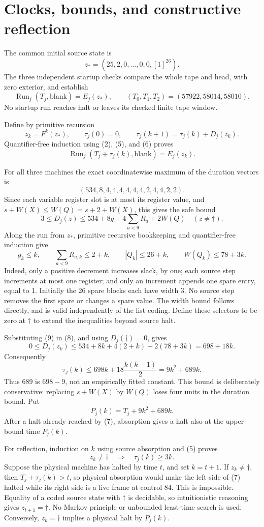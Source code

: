 \documentclass[11pt]{article}
\newcommand{\Run}{\operatorname{Run}}
\begin{document}
\section{Clocks, bounds, and constructive reflection}

The common initial source state is
\[
 z_*=(25,2,0,\ldots,0,0,[1]^{26}).
\]
The three independent startup checks compare the whole tape and head,
with zero exterior, and establish
\[
 \Run_j(T_j,\mathrm{blank})=E_j(z_*),\qquad
 (T_0,T_1,T_2)=(57922,58014,58010).                         \tag{6}
\]
No startup run reaches halt or leaves its checked finite tape window.

Define by primitive recursion
\[
 z_k=F^k(z_*),\qquad
 \tau_j(0)=0,\qquad
 \tau_j(k+1)=\tau_j(k)+D_j(z_k).
\]
Quantifier-free induction using (2), (5), and (6) proves
\[
 \Run_j(T_j+\tau_j(k),\mathrm{blank})=E_j(z_k).             \tag{7}
\]

For all three machines the exact coordinatewise maximum of the duration
vectors is
\[
 (534,8,4,4,4,4,4,4,2,4,4,2,2).
\]
Since each variable register slot is at most its register value, and
$s+W(X)\le W(Q)=s+2+W(X)$, this gives the safe bound
\[
 3\le D_j(z)\le534+8g+4\sum_{a<9}R_a+2W(Q)
 \quad(z\ne\dagger).                                    \tag{8}
\]
Along the run from $z_*$, primitive recursive bookkeeping and
quantifier-free induction give
\[
 g_k\le k,\qquad \sum_{a<9}R_{a,k}\le2+k,
 \qquad |Q_k|\le26+k,\qquad W(Q_k)\le78+3k.              \tag{9}
\]
Indeed, only a positive decrement increases slack, by one; each source
step increments at most one register; and only an increment appends one
spare entry, equal to 1. Initially the 26 spare blocks each have width
3. No source step removes the first spare or changes a spare value.
The width bound follows directly, and is valid independently of the
list coding. Define these selectors to be zero at $\dagger$ to extend
the inequalities beyond source halt.

Substituting (9) in (8), and using $D_j(\dagger)=0$, gives
\[
 0\le D_j(z_k)\le
 534+8k+4(2+k)+2(78+3k)=698+18k.
\]
Consequently
\[
 \tau_j(k)\le698k+18\frac{k(k-1)}2=9k^2+689k.             \tag{10}
\]
Thus 689 is $698-9$, not an empirically fitted constant. This bound
is deliberately conservative: replacing $s+W(X)$ by $W(Q)$ loses
four units in the duration bound. Put
\[
 P_j(k)=T_j+9k^2+689k.                                    \tag{11}
\]
After a halt already reached by (7), absorption gives a halt also
at the upper-bound time $P_j(k)$.

For reflection, induction on $k$ using source absorption and (5) proves
\[
 z_k\ne\dagger\quad\Longrightarrow\quad\tau_j(k)\ge3k.
                                                               \tag{12}
\]
Suppose the physical machine has halted by time $t$, and set $k=t+1$.
If $z_k\ne\dagger$, then $T_j+\tau_j(k)>t$, so physical absorption
would make the left side of (7) halted while its right side is a live
frame at control 84. This is impossible. Equality of a coded source
state with $\dagger$ is decidable, so intuitionistic reasoning gives
$z_{t+1}=\dagger$. No Markov principle or unbounded least-time search
is used. Conversely, $z_k=\dagger$ implies a physical halt by $P_j(k)$.
\end{document}
